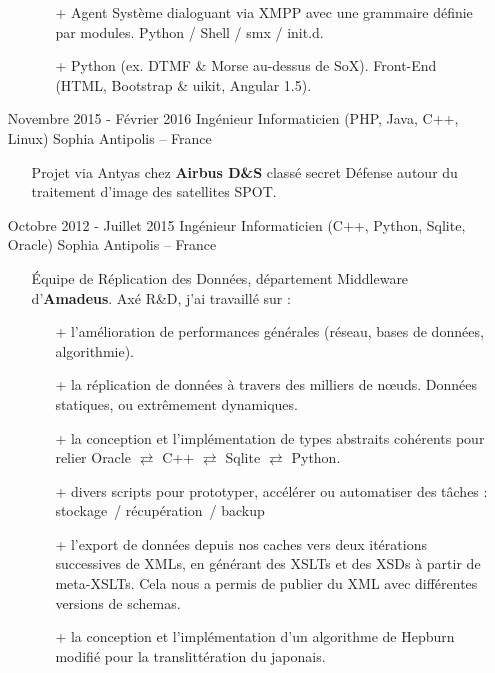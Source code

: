 \documentclass{res}
\begin{document}
\begin{resume}
\begin{itemize}
\begin{itemize}
\begin{itemize}
                \item[+] Agent Syst\`eme dialoguant via XMPP avec une grammaire d\'efinie par modules. Python / Shell / smx / init.d.
                \item[+] Python (ex. DTMF \& Morse au-dessus de SoX). Front-End (HTML, Bootstrap \& uikit, Angular 1.5).
            \end{itemize}
        \end{itemize}
        \item[] Novembre 2015 - F\'evrier 2016 \tabto{5cm} Ing\'enieur Informaticien (PHP, Java, C++, Linux) \hfill Sophia Antipolis -- France
        \begin{itemize}
            \item[] Projet via Antyas chez \textbf{Airbus D\&S} class\'e secret D\'efense autour du traitement d'image des satellites SPOT.
        \end{itemize}
        \item[] Octobre 2012 - Juillet 2015 \tabto{5cm} Ing\'enieur Informaticien (C++, Python, Sqlite, Oracle)  \hfill Sophia Antipolis -- France
        \begin{itemize}
            \item[] \'Equipe de R\'eplication des Donn\'ees, d\'epartement Middleware d'\textbf{Amadeus}. Ax\'e R\&D, j'ai travaill\'e sur :
            \begin{itemize}
                \item[+] l'am\'elioration de performances g\'en\'erales (r\'eseau, bases de donn\'ees, algorithmie).
                \item[+] la r\'eplication de donn\'ees \`a travers des milliers de n\oe{}uds. Donn\'ees statiques, ou extr\^emement dynamiques.
                \item[+] la conception et l'impl\'ementation de types abstraits cohérents pour relier Oracle $\rightleftarrows$ C++ $\rightleftarrows$ Sqlite $\rightleftarrows$ Python.
                \item[+] divers scripts pour prototyper, acc\'el\'erer ou automatiser des t\^aches : stockage~/ r\'ecup\'eration~/ backup\textellipsis
                \item[+] l'export de donn\'ees depuis nos caches vers deux it\'erations successives de XMLs, en g\'en\'erant des XSLTs et des XSDs \`a partir de meta-XSLTs. Cela nous a permis de publier du XML avec diff\'erentes versions de schemas.
                \item[+] la conception et l'impl\'ementation d'un algorithme de Hepburn modifi\'e pour la translitt\'eration du japonais.

\end{itemize}
\end{itemize}
\end{itemize}
\end{resume}
\end{document}
